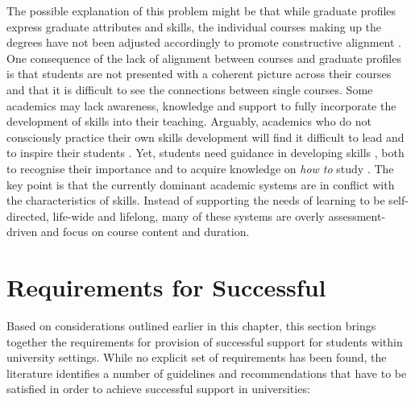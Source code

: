 The possible explanation of this problem might be that while graduate profiles
express graduate attributes and \LLLs skills, the individual courses making up
the degrees have not been adjusted accordingly to promote constructive alignment
\citep{Hughes2010,Biggs2007}. One consequence of the lack of alignment between
courses and graduate profiles is that students are not presented with a coherent
picture across their courses and that it is difficult to see the connections
between single courses. Some academics may lack awareness, knowledge and support
to fully incorporate the development of \LLLs skills into their teaching.
Arguably, academics who do not consciously practice their own \LLLs skills
development will find it difficult to lead and to inspire their students
\citep{Linden2003}. Yet, students need guidance in developing \LLLs skills
\citep{Leone2019}, both to recognise their importance and to acquire knowledge
on \textit{how to} study \citep{Medel-Anonuevo2001}. The key point is that the
currently dominant academic systems are in conflict with the characteristics of
\LLLs skills. Instead of supporting the needs of learning to be self-directed,
life-wide and lifelong, many of these systems are overly assessment-driven and
focus on course content and duration.

\section{Requirements for Successful \LLLc}
\label{sec:needs}
Based on considerations outlined earlier in this chapter, this section brings
together the requirements for provision of successful \LLLs support for
students within university settings. While no explicit set of requirements has
been found, the literature identifies a number of guidelines and recommendations
that have to be satisfied in order to achieve successful \LLLs support in
universities:
 
